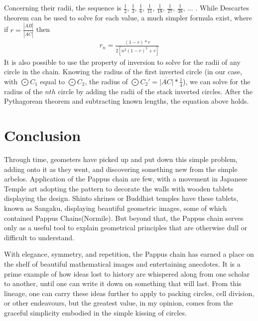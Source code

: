 \documentclass[12pt]{article}
\begin{document}
Concerning their radii, the sequence is $\frac{1}{2}$, $\frac{1}{3}$, $\frac{1}{6}$, $\frac{1}{11}$, $\frac{1}{18}$, $\frac{1}{27}$, $\frac{1}{38}$, ... . While Descartes theorem can be used to solve for each value, a much simpler formula exist, where if $r = \frac{|\overline{AB}|}{|\overline{AC}|}$ then 
\begin{align*}
    r_n = \frac{(1-r)*r}{2[n^2(1-r)^2+r]}
\end{align*}
It is also possible to use the property of inversion to solve for the radii of any circle in the chain. Knowing the radius of the first inverted circle (in our case, with $\bigodot{C_1}$ equal to $\bigodot{C_2}$, the radius of $\bigodot{C_2'} = \overline{|AC|} * \frac{1}{4}$), we can solve for the radius of the $nth$ circle by adding the radii of the stack inverted circles. After the Pythagorean theorem and subtracting known lengths, the equation above holds. 
\newpage
\section{Conclusion}
\hspace{\parindent}Through time, geometers have picked up and put down this simple problem, adding onto it as they went, and discovering something new from the simple arbelos. Application of the Pappus chain are few, with a movement in Japanese Temple art adopting the pattern to decorate the walls with wooden tablets displaying the design. Shinto shrines or Buddhist temples have these tablets, known as Sangaku, displaying beautiful geometric images, some of which contained Pappus Chains(Normile). But beyond that, the Pappus chain serves only as a useful tool to explain geometrical principles that are otherwise dull or difficult to understand. 

With elegance, symmetry, and repetition, the Pappus chain has earned a place on the shelf of beautiful mathematical images and entertaining anecdotes. It is a prime example of how ideas lost to history are whispered along from one scholar to another, until one can write it down on something that will last. From this lineage, one can carry these ideas further to apply to packing circles, cell division, or other endeavours, but the greatest value, in my opinion, comes from the graceful simplicity embodied in the simple kissing of circles. 
\end{document}
